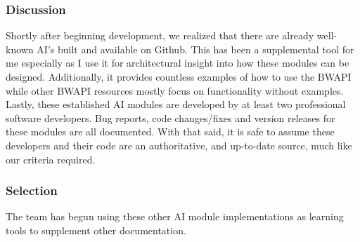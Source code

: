 \subsubsection{Discussion}
Shortly after beginning development, we realized that there are already well-known AI's built and available on Github. This has been a supplemental tool for me especially as I use it for architectural insight into how these modules can be designed. Additionally, it provides countless examples of how to use the BWAPI while other BWAPI resources mostly focus on functionality without examples. Lastly, these established AI modules are developed by at least two professional software developers. Bug reports, code changes/fixes and version releases for these modules are all documented. With that said, it is safe to assume these developers and their code are an authoritative, and up-to-date source, much like our criteria required. 
\subsubsection{Selection}
The team has begun using these other AI module implementations as learning tools to supplement other documentation.